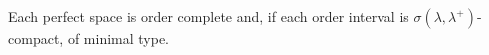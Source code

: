 Each perfect space is order complete and, if each order interval is $\sigma(\lambda, \lambda^+)$-compact, of minimal type.

